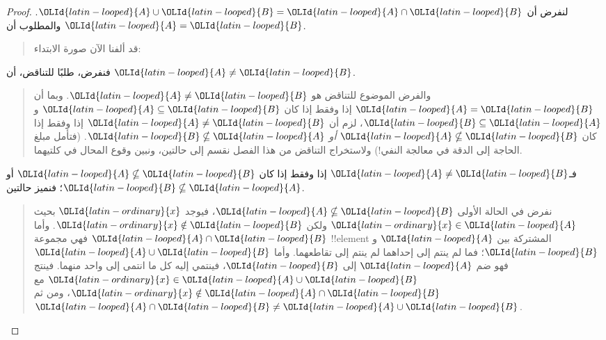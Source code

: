 \documentclass[../../../include/open-logic-section]{subfiles}
\begin{document}
\begin{proof}
  لنفرض أن ${\OLId{latin-looped}{A}} \cup {\OLId{latin-looped}{B}} = {\OLId{latin-looped}{A}} \cap {\OLId{latin-looped}{B}}$. والمطلوب أن ${\OLId{latin-looped}{A}} = {\OLId{latin-looped}{B}}$.
  \begin{quote}
    قد ألفنا الآن صورة الابتداء:
  \end{quote}
  فنفرض، طلبًا للتناقض، أن ${\OLId{latin-looped}{A}} \neq {\OLId{latin-looped}{B}}$.
  \begin{quote}
    والفرض الموضوع للتناقض هو ${\OLId{latin-looped}{A}} \neq {\OLId{latin-looped}{B}}$. وبما أن ${\OLId{latin-looped}{A}} = {\OLId{latin-looped}{B}}$ إذا وفقط
    إذا كان ${\OLId{latin-looped}{A}} \subseteq {\OLId{latin-looped}{B}}$ و${\OLId{latin-looped}{B}} \subseteq {\OLId{latin-looped}{A}}$، لزم أن
    ${\OLId{latin-looped}{A}} \neq {\OLId{latin-looped}{B}}$ إذا وفقط إذا كان ${\OLId{latin-looped}{A}} \nsubseteq {\OLId{latin-looped}{B}}$ \emph{أو}
    ${\OLId{latin-looped}{B}} \nsubseteq {\OLId{latin-looped}{A}}$. (فتأمل مبلغ الحاجة إلى الدقة في معالجة
    النفي!{}) ولاستخراج التناقض من هذا الفصل نقسم إلى حالتين، ونبين
    وقوع المحال في كلتيهما.
  \end{quote}
  فـ${\OLId{latin-looped}{A}} \neq {\OLId{latin-looped}{B}}$ إذا وفقط إذا كان ${\OLId{latin-looped}{A}} \nsubseteq {\OLId{latin-looped}{B}}$ أو
  ${\OLId{latin-looped}{B}} \nsubseteq {\OLId{latin-looped}{A}}$؛ فنميز حالتين.
  \begin{quote}
    نفرض في الحالة الأولى ${\OLId{latin-looped}{A}} \nsubseteq {\OLId{latin-looped}{B}}$، فيوجد ${\OLId{latin-ordinary}{x}}$ بحيث
    ${\OLId{latin-ordinary}{x}} \in {\OLId{latin-looped}{A}}$ ولكن ${\OLId{latin-ordinary}{x}} \notin {\OLId{latin-looped}{B}}$. وأما ${\OLId{latin-looped}{A}} \cap {\OLId{latin-looped}{B}}$ فهي مجموعة
    !!{element} المشتركة بين ${\OLId{latin-looped}{A}}$ و${\OLId{latin-looped}{B}}$؛ فما لم ينتم إلى إحداهما لم
    ينتم إلى تقاطعهما. وأما ${\OLId{latin-looped}{A}} \cup {\OLId{latin-looped}{B}}$ فهو ضم ${\OLId{latin-looped}{A}}$ إلى ${\OLId{latin-looped}{B}}$، فينتمي
    إليه كل ما انتمى إلى واحد منهما. فينتج
    ${\OLId{latin-ordinary}{x}} \in {\OLId{latin-looped}{A}} \cup {\OLId{latin-looped}{B}}$ مع ${\OLId{latin-ordinary}{x}} \notin {\OLId{latin-looped}{A}} \cap {\OLId{latin-looped}{B}}$، ومن ثم
    ${\OLId{latin-looped}{A}} \cap {\OLId{latin-looped}{B}} \neq {\OLId{latin-looped}{A}} \cup {\OLId{latin-looped}{B}}$.
  \end{quote}


\end{proof}
\end{document}
